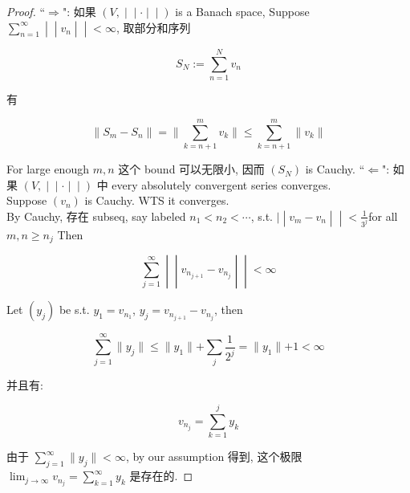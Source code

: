 \documentclass{qlnotes-export}
\begin{document}
\begin{proof}

``\(\Longrightarrow\)": 如果 \(\left. (V, \middle| \middle| \cdot \middle| \middle| ) \right.\) is a Banach space, Suppose \(\left. \sum_{n = 1}^{\infty} \middle| \middle| v_{n} \middle| \middle| < \infty \right.\), 取部分和序列

\[S_{N} := \sum\limits_{n = 1}^{N}v_{n}\]

有

\[\parallel S_{m} - S_{n} \parallel = \parallel \sum\limits_{k = n + 1}^{m}v_{k} \parallel \leq \sum\limits_{k = n + 1}^{m} \parallel v_{k} \parallel\]

For large enough \(m,n\) 这个 bound 可以无限小, 因而 \((S_{N})\) is Cauchy. ``\(\Longleftarrow\)": 如果 \(\left. (V, \middle| \middle| \cdot \middle| \middle| ) \right.\) 中 every absolutely convergent series converges.\\
Suppose \((v_{n})\) is Cauchy. WTS it converges.\\
By Cauchy, 存在 subseq, say labeled \(n_{1} < n_{2} < \cdots\), s.t. \(\left. | \middle| v_{m} - v_{n} \middle| \middle| < \frac{1}{3^{j}} \right.\)for all \(m,n \geq n_{j}\) Then

\[\left. \sum\limits_{j = 1}^{\infty} \middle| \middle| v_{n_{j + 1}} - v_{n_{j}} \middle| \middle| < \infty \right.\]

Let \((y_{j})\) be s.t. \(y_{1} = v_{n_{1}}\), \(y_{j} = v_{n_{j + 1}} - v_{n_{j}}\), then

\[\sum\limits_{j = 1}^{\infty} \parallel y_{j} \parallel \leq \parallel y_{1} \parallel + \sum\limits_{j}\frac{1}{2^{j}} = \parallel y_{1} \parallel + 1 < \infty\]

并且有:

\[v_{n_{j}} = \sum\limits_{k = 1}^{j}y_{k}\]

由于 \(\sum_{j = 1}^{\infty} \parallel y_{j} \parallel < \infty\), by our assumption 得到, 这个极限 \(\lim_{j\rightarrow\infty}v_{n_{j}} = \sum_{k = 1}^{\infty}y_{k}\) 是存在的.

\end{proof}
\end{document}
